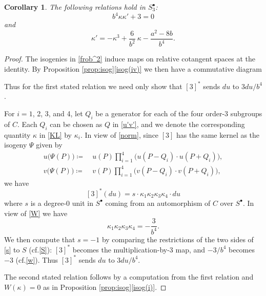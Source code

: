 \documentclass{gtpart}
\newtheorem{cor}[thm]{Corollary}
\theoremstyle{definition}
\theoremstyle{remark}
\newcommand{\cf}{cf.\thinspace}
\newcommand{\K}{\kappa}
\newcommand{\s}{S^\bullet}
\newcommand{\isog}[1]{Proposition \ref{prop:isog}\thinspace \eqref{isog(#1)}}
\begin{document}
\begin{cor}
\label{cor:K'}
 The following relations hold in $\s_3$: 
 \[
  b^4 \K \K' + 3 = 0 
 \]
 and 
 \[
  \K' = -\K^3 + \frac{6}{b^2} ~ \K - \frac{a^2 - 8 b}{b^4}.  
 \]
\end{cor}
\begin{proof}
 The isogenies in \eqref{frob^2} induce maps on relative cotangent spaces at the identity.  
 By \isog{iv} we then have a commutative diagram 
 \begin{center}
 \end{center}
 Thus for the first stated relation we need only show that $[3]^*$ sends $du$ to $3 du / b^4$.  

 For $i = 1$, 2, 3, and 4, let $Q_i$ be a generator for each of the four order-3 subgroups of $C$.  
 Each $Q_i$ can be chosen as $Q$ in \eqref{u'v'}, 
 and we denote the corresponding quantity $\K$ in \eqref{KL} by $\K_i$.  
 In view of \eqref{norm}, since $[3]$ has the same kernel as the isogeny $\Psi$ given by 
 \begin{equation*}
 \begin{split}
  u\big( \Psi(P) \big) \coloneqq & ~ u(P) \prod_{i=1}^4 \big( u(P-Q_i) \cdot u(P+Q_i) \big), \\
  v\big( \Psi(P) \big) \coloneqq & ~ v(P) \prod_{i=1}^4 \big( v(P-Q_i) \cdot v(P+Q_i) \big), 
 \end{split}
 \end{equation*}
 we have 
 \begin{equation}
 \label{s}
  [3]^* (du) = s \cdot \K_1 \K_2 \K_3 \K_4 \cdot du 
 \end{equation}
 where $s$ is a degree-0 unit in $\s$ coming from an automorphism of $C$ over $\s$.  
 In view of \eqref{W} we have 
 \[
  \K_1 \K_2 \K_3 \K_4 = -\frac{3}{b^4}.  
 \]
 We then compute that $s = -1$ by comparing the restrictions of the two sides of \eqref{s} to $S$ (\cf \eqref{S}): 
 $[3]^*$ becomes the multiplication-by-3 map, and $-3 / b^4$ becomes $-3$ (\cf \eqref{w}).  
 Thus $[3]^*$ sends $du$ to $3 du / b^4$.  

 The second stated relation follows by a computation from the first relation and $W(\K) = 0$ as in \isog{i}.  
\end{proof}
\end{document}

